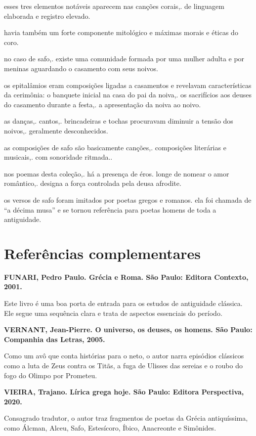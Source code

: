\documentclass[12pt]{extarticle}
\begin{document}
esses tres elementos notáveis aparecem nas canções corais,. de linguagem
elaborada e registro elevado.


havia também um forte componente mitológico e máximas morais e éticas do
coro.


no caso de safo,. existe uma comunidade formada por uma mulher adulta e
por meninas aguardando o casamento com seus noivos.


os epitalâmios eram composições ligadas a casamentos e revelavam
características da cerimônia: o banquete inicial na casa do pai da
noiva,. os sacrifícios aos deuses do casamento durante a festa,. a
apresentação da noiva ao noivo.


as danças,. cantos,. brincadeiras e tochas procuravam diminuir a tensão
dos noivos,. geralmente desconhecidos.

as composições de safo são basicamente canções,. composições literárias
e musicais,. com sonoridade ritmada..


nos poemas desta coleção,. há a presença de éros. longe de nomear o amor
romântico,. designa a força controlada pela deusa afrodite.


os versos de safo foram imitados por poetas gregos e romanos. ela foi
chamada de ``a décima musa'' e se tornou referência para poetas homens
de toda a antiguidade.


\section{Referências complementares}

\textbf{FUNARI, Pedro Paulo. Grécia e Roma. São Paulo: Editora Contexto,
2001.}

Este livro é uma boa porta de entrada para os estudos de antiguidade
clássica. Ele segue uma sequência clara e trata de aspectos essenciais
do período.

\textbf{VERNANT, Jean-Pierre. O universo, os deuses, os homens. São
Paulo: Companhia das Letras, 2005.}

Como um avô que conta histórias para o neto, o autor narra episódios
clássicos como a luta de Zeus contra os Titãs, a fuga de Ulisses das
sereias e o roubo do fogo do Olimpo por Prometeu.

\textbf{VIEIRA, Trajano. Lírica grega hoje. São Paulo: Editora
Perspectiva, 2020.}

Consagrado tradutor, o autor traz fragmentos de poetas da Grécia
antiquíssima, como Álcman, Alceu, Safo, Estesícoro, Íbico, Anacreonte e
Simônides.
\end{document}

